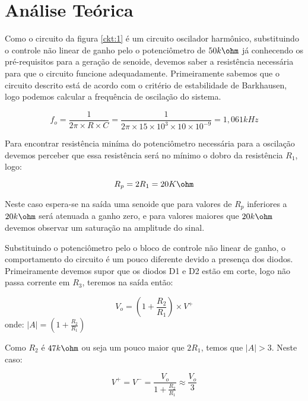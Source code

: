 \setlength{\abovedisplayskip}{-25pt}
\setlength{\belowdisplayskip}{-25pt}

\section{Análise Teórica}

Como o circuito da figura \ref{ckt:1} é um circuito oscilador harmônico, substituindo o controle não linear de ganho pelo o potenciômetro de $50k\ohm$   já conhecendo os pré-requisitos para a geração de senoide, devemos saber a resistência necessária para que o circuito funcione adequadamente. Primeiramente sabemos que o circuito descrito está de acordo com o critério de estabilidade de Barkhausen, logo podemos calcular a frequência de oscilação do sistema.


\begin{equation} \label{freqq}
f_o = \frac{1}{2\pi \times R \times C} = \frac{1}{2\pi \times 15\times10^3 \times 10\times10^{-9}} = 1,061kHz
\end{equation}

Para encontrar resistência miníma do potenciômetro necessária para a oscilação devemos perceber que essa resistência será no mínimo o dobro da resistência $R_1$, logo:

\begin{equation} \label{int}
R_p = 2R_1 = 20K\ohm
\end{equation}

Neste caso espera-se na saída uma senoide que para valores de $R_p$ inferiores a $20k\ohm$ será atenuada a ganho zero, e para valores maiores que $20k\ohm$ devemos observar um saturação na amplitude do sinal.

Substituindo o potenciômetro pelo o bloco de controle não linear de ganho, o comportamento do circuito é um pouco diferente devido a presença dos diodos. Primeiramente devemos supor que os diodos D1 e D2 estão em corte, logo não passa corrente em $R_3$, teremos na saída então:

\begin{equation} \label{int}
V_o = (1+\frac{R_2}{R_1})\times V^+
\end{equation}
onde:
$|A| = (1+\frac{R_2}{R_1}) $

Como $R_2$ é $47k\ohm$ ou seja um pouco maior  que $2R_1$, temos que $|A|>3$. Neste caso:

\begin{equation} \label{int}
V^+ = V^- = \frac{V_o}{1+\frac{R_2}{R_1}} \approx \frac{V_o}{3}
\end{equation}

